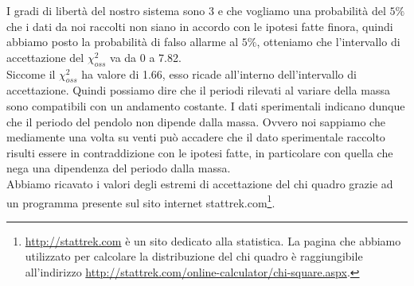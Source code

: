 I gradi di libertà del nostro sistema sono 3 e che vogliamo una probabilità del $5\%$ che i dati da noi raccolti non siano in accordo con le ipotesi fatte finora, quindi abbiamo posto la probabilità di falso allarme al $5\%$, otteniamo che l'intervallo di accettazione del $\chi_{oss}^2$ va da 0 a 7.82.\\
Siccome il $\chi_{oss}^2$ ha valore di 1.66, esso ricade all'interno dell'intervallo di accettazione. Quindi possiamo dire che il periodi rilevati
al variare della massa sono compatibili con un andamento costante. I dati sperimentali indicano dunque che
il periodo del pendolo non dipende dalla massa. Ovvero noi sappiamo che mediamente una volta su venti può accadere che il dato sperimentale raccolto risulti essere in contraddizione con le ipotesi fatte, in particolare con quella che nega una dipendenza del periodo dalla massa.\\
Abbiamo ricavato i valori degli estremi di accettazione del chi quadro grazie ad un programma presente sul sito internet stattrek.com\footnote{
\url{http://stattrek.com} è un sito dedicato alla statistica. La pagina che abbiamo utilizzato per calcolare la distribuzione del chi quadro
è raggiungibile all'indirizzo \url{http://stattrek.com/online-calculator/chi-square.aspx}.}.
